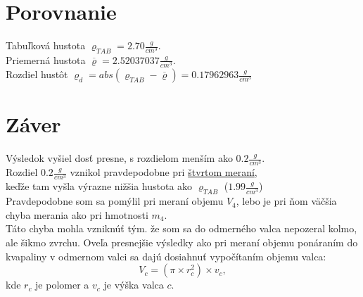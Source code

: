 \documentclass{article}
\begin{document}
\section{Porovnanie}
Tabuľková hustota $\varrho_{TAB} = 2.70 \frac{g}{cm^3}$.\\
Priemerná hustota $\overline{\varrho} =  2.52037037 \frac{g}{cm^3}$.\\
Rozdiel hustôt $\varrho_d = abs(\varrho_{TAB}-\overline{\varrho}) =  0.17962963  \frac{g}{cm^3} $\\
\section{Záver}
Výsledok vyšiel dosť presne, s rozdielom menším ako $0.2 \frac{g}{cm^3}$.\\
Rozdiel $0.2 \frac{g}{cm^3}$ vznikol pravdepodobne pri \hyperref[sec:v4]{štvrtom meraní}, \\
keďže tam vyšla výrazne nižšia hustota ako $\varrho_{TAB}$ ($1.99 \frac{g}{cm^3}$) \\
Pravdepodobne som sa pomýlil pri meraní objemu $V_4$, lebo je pri ňom väčšia chyba merania ako pri hmotnosti $m_4$.\\
Táto chyba mohla vzniknúť tým. že som sa do odmerného valca nepozeral kolmo, ale šikmo zvrchu.
Oveľa presnejšie výsledky ako pri meraní objemu ponáraním do kvapaliny v odmernom valci sa dajú dosiahnuť vypočítaním objemu valca:
\[
	V_c=(\pi \times r_c^2)\times v_c,
\]
kde $r_c$ je polomer a $v_c$ je výška valca $c$.
\end{document}
